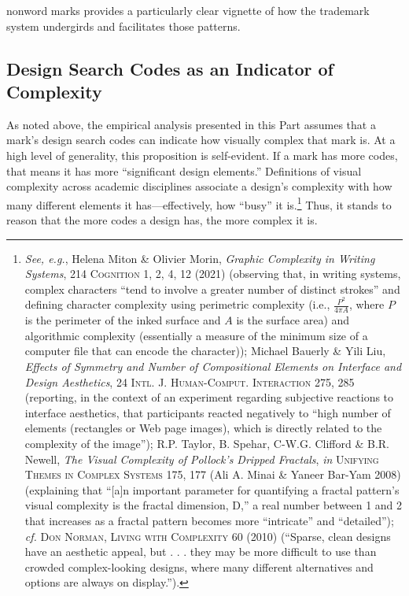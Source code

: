 \documentclass[letterpaper, 11pt, oneside]{article}
\begin{document}
nonword marks provides a particularly clear vignette of how the trademark system undergirds and facilitates those patterns.

\subsection{Design Search Codes as an Indicator of Complexity}\label{subsec:2A}

As noted above, the empirical analysis presented in this Part assumes that a mark's design search codes can indicate how visually complex that mark is. At a high level of generality, this proposition is self-evident. If a mark has more codes, that means it has more ``significant design elements.'' Definitions of visual complexity across academic disciplines associate a design's complexity with how many different elements it has—effectively, how ``busy'' it is.\footnote{\label{supra24} \textit{See, e.g.}, Helena Miton \& Olivier Morin, \textit{Graphic Complexity in Writing Systems}, 214 \textsc{Cognition} 1, 2, 4, 12 (2021) (observing that, in writing systems, complex characters ``tend to involve a greater number of distinct strokes'' and defining character complexity using perimetric complexity (i.e., $\frac{P^2}{4{\pi}A}$, where $P$ is the perimeter of the inked surface and $A$ is the surface area) and algorithmic complexity (essentially a measure of the minimum size of a computer file that can encode the character)); Michael Bauerly \& Yili Liu, \textit{Effects of Symmetry and Number of Compositional Elements on Interface and Design Aesthetics}, 24 \textsc{Intl. J. Human-Comput. Interaction} 275, 285 (reporting, in the context of an experiment regarding subjective reactions to interface aesthetics, that participants reacted negatively to ``high number of elements (rectangles or Web page images), which is directly related to the complexity of the image''); R.P. Taylor, B. Spehar, C-W.G. Clifford \& B.R. Newell, \textit{The Visual Complexity of Pollock's Dripped Fractals}, \textit{in} \textsc{Unifying Themes in Complex Systems} 175, 177 (Ali A. Minai \& Yaneer Bar-Yam 2008) (explaining that ``[a]n important parameter for quantifying a fractal pattern's visual complexity is the fractal dimension, D,'' a real number between 1 and 2 that increases as a fractal pattern becomes more ``intricate'' and ``detailed''); \textit{cf.} \textsc{Don Norman, Living with Complexity} 60 (2010) (``Sparse, clean designs have an aesthetic appeal, but . . . they may be more difficult to use than crowded complex-looking designs, where many different alternatives and options are always on display.''). } Thus, it stands to reason that the more codes a design has, the more complex it is.
\end{document}
